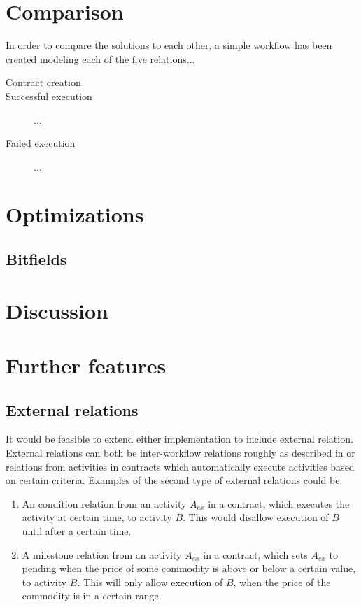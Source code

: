\documentclass{article}
\begin{document}
	\section{Comparison}
	In order to compare the solutions to each other, a simple workflow has been created modeling each of the five relations...

	\begin{description}
		\item[Contract creation]
		\item[Successful execution] ...
		\item[Failed execution] ... 
	\end{description}

	\section{Optimizations}

		\subsection{Bitfields}

	\section{Discussion}

	\section{Further features}

		\subsection{External relations}
		It would be feasible to extend either implementation to include external relation. 
		External relations can both be inter-workflow relations roughly as described in \cite{distributed-workflows} or relations from activities in contracts which automatically execute activities based on certain criteria. Examples of the second type of external relations could be:
		\begin{enumerate}
			\item An condition relation from an activity $A_{ex}$ in a contract, which executes the activity at certain time, to activity $B$. This would disallow execution of $B$ until after a certain time.
			\item A milestone relation from an activity $A_{ex}$ in a contract, which sets $A_{ex}$ to pending when the price of some commodity is above or below a certain value, to activity $B$.
			This will only allow execution of $B$, when the price of the commodity is in a certain range.
		\end{enumerate}
\end{document}
